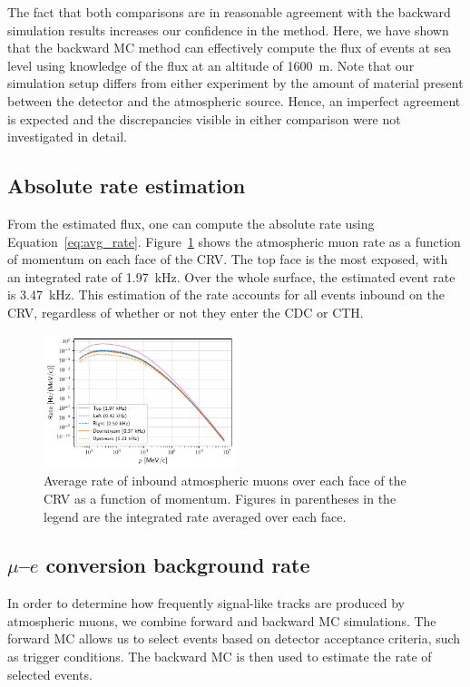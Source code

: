 The fact that both comparisons are in reasonable agreement with the backward
simulation results increases our confidence in the method. Here, we have shown
that the backward MC method can effectively compute the flux of events at sea
level using knowledge of the flux at an altitude of \SI{1600}{\metre}. Note that
our simulation setup differs from either experiment by the amount of material
present between the detector and the atmospheric source. Hence, an imperfect
agreement is expected and the discrepancies visible in either comparison were not
investigated in detail.

\subsection{Absolute rate estimation}
From the estimated flux, one can compute the absolute rate using
Equation~\ref{eq:avg_rate}. Figure~\ref{fig:avg_rate_per_face} shows the
atmospheric muon rate as a function of momentum on each face of the CRV. The top
face is the most exposed, with an integrated rate of \SI{1.97}{\kHz}. Over the
whole surface, the estimated event rate is \SI{3.47}{\kHz}. This estimation of
the rate accounts for all events inbound on the CRV, regardless of whether or
not they enter the CDC or CTH. 


\begin{figure}
    \centering
    \includegraphics[width=0.5\textwidth]{chapter5/rate_vs_p.pdf}
    \caption{
        Average rate of inbound atmospheric muons over each face of the CRV as a
        function of momentum. Figures in parentheses in the legend are the
        integrated rate averaged over each face.
    }
    \label{fig:avg_rate_per_face}
\end{figure}

\subsection{\texorpdfstring{$\mu$--$e$}{Muon to electron} conversion background rate}
In order to determine how frequently signal-like tracks are produced by
atmospheric muons, we combine forward and backward MC simulations. The forward
MC allows us to select events based on detector acceptance criteria, such as
trigger conditions. The backward MC is then used to estimate the rate of
selected events.

